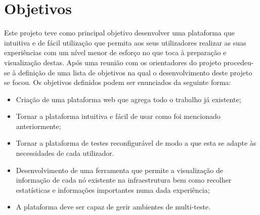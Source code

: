 \section{Objetivos}
Este projeto teve como principal objetivo desenvolver uma plataforma que intuitiva e de fácil utilização que permita aos seus utilizadores realizar as suas experiências com um nível menor de esforço no que toca à preparação  e  visualização destas.\newline
Após uma reunião com os orientadores do projeto procedeu-se à definição de uma lista de objetivos na qual o desenvolvimento deste projeto se focou. Os objetivos definidos podem ser enunciados da seguinte forma:
\begin{itemize}
    \item Criação de uma plataforma web que agrega todo o trabalho já existente;
    \item Tornar a plataforma intuitiva e fácil de usar como foi mencionado anteriormente;
    \item Tornar a plataforma de testes reconfigurável de modo a que esta se adapte às necessidades de cada utilizador.
    \item Desenvolvimento de uma ferramenta que permite a visualização de informação de cada nó existente na infraestrutura bem como recolher estatísticas e informações importantes numa dada experiência;
    \item A plataforma deve ser capaz de gerir ambientes de multi-teste.
\end{itemize}

